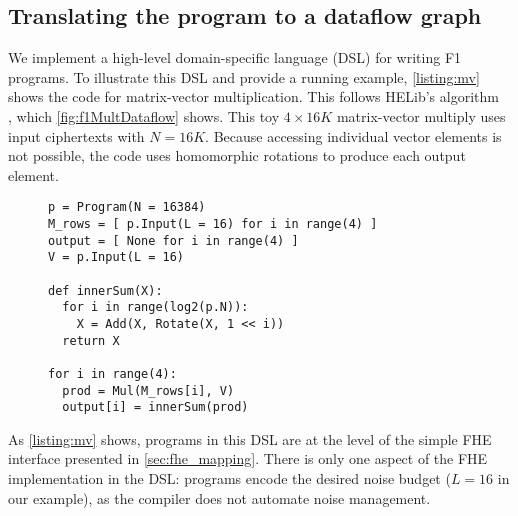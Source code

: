 \subsection{Translating the program to a dataflow graph}
\label{sec:programming}

We implement a high-level domain-specific language (DSL) for writing F1 programs.
%
To illustrate this DSL and provide a running example,
\autoref{listing:mv} shows the code for matrix-vector multiplication.
This follows HELib's algorithm~\cite{halevi:crypto14:algorithms}
, which \autoref{fig:f1MultDataflow} shows.
This toy $4 \times 16K$ matrix-vector multiply uses input ciphertexts with $N=16K$.
Because accessing individual vector elements is not possible, the code uses homomorphic rotations %
to produce each output element.

\figFOneMultDataflow

\begin{figure}
\begin{center}
  \begin{lstlisting}[caption={$(4 \times 16K)$ matrix-vector multiply in F1's DSL.}, mathescape=true, style=custompython, label=listing:mv]
p = Program(N = 16384)
M_rows = [ p.Input(L = 16) for i in range(4) ]
output = [ None for i in range(4) ]
V = p.Input(L = 16)

def innerSum(X):
  for i in range(log2(p.N)):
    X = Add(X, Rotate(X, 1 << i))
  return X

for i in range(4):
  prod = Mul(M_rows[i], V)
  output[i] = innerSum(prod)
  \end{lstlisting}
\end{center}
\vspace{0.15cm}
\end{figure}

As \autoref{listing:mv} shows, programs in this DSL are at the level
of the simple FHE interface presented in \autoref{sec:fhe_mapping}.
There is only one aspect of the FHE implementation in the DSL:
programs encode the desired noise budget ($L=16$ in our example),
as the compiler does not automate noise management.

